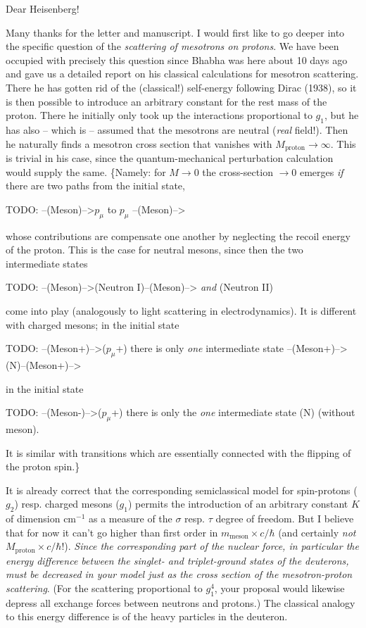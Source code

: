 \date{April 27, 1939}

Dear Heisenberg!

Many thanks for the letter and manuscript. I would first like to go deeper into the specific question of the \textit{scattering of mesotrons on protons}. We have been occupied with precisely this question since Bhabha was here about 10 days ago and gave us a detailed report on his classical calculations for mesotron scattering. There he has gotten rid of the (classical!) self-energy following Dirac (1938), so it is then possible to introduce an arbitrary constant for the rest mass of the proton. There he initially only took up the interactions proportional to $g_1$, but he has also -- which is  -- assumed that the mesotrons are neutral (\textit{real} field!). Then he naturally finds a mesotron cross section that vanishes with $M_\text{proton} \to \infty$. This is trivial in his case, since the quantum-mechanical perturbation calculation would supply the same. \{Namely: for $M\to 0$ the cross-section $\to 0$ emerges \textit{if} there are two paths from the initial state,

TODO: --(Meson)-->$p_\mu$ to $p_\mu$ --(Meson)-->

whose contributions are compensate one another by neglecting the recoil energy of the proton. This is the case for neutral mesons, since then the two intermediate states

TODO: --(Meson)-->(Neutron I)--(Meson)--> \textit{and} (Neutron II)

come into play (analogously to light scattering in electrodynamics). It is different with charged mesons; in the initial state

TODO: --(Meson+)-->($p_\mu$+) there is only \textit{one} intermediate state --(Meson+)-->(N)--(Meson+)-->

in the initial state

TODO: --(Meson-)-->($p_\mu$+) there is only the \textit{one} intermediate state (N) (without meson).

It is similar with transitions which are essentially connected with the flipping of the proton spin.\}

It is already correct that the corresponding semiclassical model for spin-protons ($g_2$) resp. charged mesons ($g_1$) permits the introduction of an arbitrary constant $K$ of dimension $\text{cm}^{-1}$ as a measure  of the $\sigma$ resp. $\tau$ degree of freedom. But I believe that for now it can't go higher than first order in $m_\text{meson}\times c/\hbar$ (and certainly \textit{not} $M_\text{proton}\times c/\hbar$!). \textit{Since the corresponding part of the nuclear force, in particular the energy difference between the singlet- and triplet-ground states of the deuterons, must be decreased in your model just as the cross section of the mesotron-proton scattering}. (For the scattering proportional to $g_1^4$, your proposal would likewise depress all exchange forces between neutrons and protons.) The classical analogy to this energy difference is  of the heavy particles in the deuteron.

